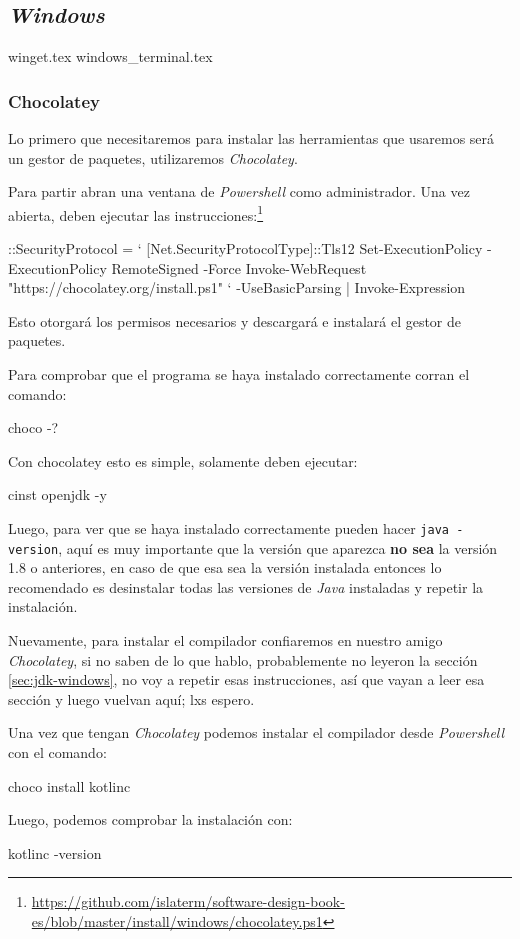 \subsection{\textit{Windows}}
  {winget.tex}
  {windows_terminal.tex}
  \subsubsection{Chocolatey}
    Lo primero que necesitaremos para instalar las herramientas que usaremos será un gestor de 
    paquetes, utilizaremos \textit{Chocolatey}.\autocite{choco}
  
    Para partir abran una ventana de \textit{Powershell} como administrador.
    Una vez abierta, deben ejecutar las instrucciones:\footnote{
      \url{https://github.com/islaterm/software-design-book-es/blob/master/install/windows/chocolatey.ps1}
    }
    \begin{powershell}
      ::SecurityProtocol = `
        [Net.SecurityProtocolType]::Tls12
      Set-ExecutionPolicy -ExecutionPolicy RemoteSigned -Force
      Invoke-WebRequest "https://chocolatey.org/install.ps1" `
        -UseBasicParsing | Invoke-Expression
    \end{powershell}
  
    Esto otorgará los permisos necesarios y descargará e instalará el gestor de paquetes.
  
    Para comprobar que el programa se haya instalado correctamente corran el comando:
    \begin{powershell}
      choco -?
    \end{powershell}
    Con chocolatey esto es simple, solamente deben ejecutar:
    \begin{powershell}
      cinst openjdk -y
    \end{powershell}
    
    Luego, para ver que se haya instalado correctamente pueden hacer \texttt{java -version}, aquí es
    muy importante que la versión que aparezca \textbf{no sea} la versión 1.8 o anteriores, en caso 
    de que esa sea la versión instalada entonces lo recomendado es desinstalar todas las versiones
    de \textit{Java} instaladas y repetir la instalación.
  
  Nuevamente, para instalar el compilador confiaremos en nuestro amigo 
  \textit{Chocolatey}, si no saben de lo que hablo, probablemente no leyeron la
  sección \ref{sec:jdk-windows}, no voy a repetir esas instrucciones, así que vayan a leer esa
  sección y luego vuelvan aquí; lxs espero.

  Una vez que tengan \textit{Chocolatey} podemos instalar el compilador desde \textit{Powershell}
  con el comando:

  \begin{powershell}
    choco install kotlinc
  \end{powershell}

  Luego, podemos comprobar la instalación con:
  \begin{powershell}
    kotlinc -version
  \end{powershell}